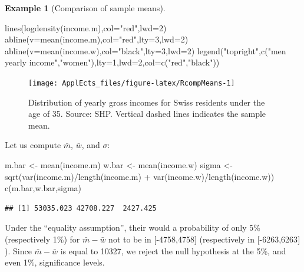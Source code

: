 \documentclass[
  12pt,
]{book}
\newenvironment{Shaded}{\begin{snugshade}}{\end{snugshade}}
\newcommand{\AttributeTok}[1]{\textcolor[rgb]{0.77,0.63,0.00}{#1}}
\newcommand{\DecValTok}[1]{\textcolor[rgb]{0.00,0.00,0.81}{#1}}
\newcommand{\FunctionTok}[1]{\textcolor[rgb]{0.00,0.00,0.00}{#1}}
\newcommand{\NormalTok}[1]{#1}
\newcommand{\OtherTok}[1]{\textcolor[rgb]{0.56,0.35,0.01}{#1}}
\newcommand{\SpecialCharTok}[1]{\textcolor[rgb]{0.00,0.00,0.00}{#1}}
\newcommand{\StringTok}[1]{\textcolor[rgb]{0.31,0.60,0.02}{#1}}
\theoremstyle{definition}
\theoremstyle{definition}
\newtheorem{example}{Example}[chapter]
\theoremstyle{definition}
\theoremstyle{definition}
\theoremstyle{remark}
\begin{document}
\begin{example}[Comparison of sample means]
\begin{Shaded}
\begin{Highlighting}[]
\FunctionTok{lines}\NormalTok{(}\FunctionTok{logdensity}\NormalTok{(income.m),}\AttributeTok{col=}\StringTok{"red"}\NormalTok{,}\AttributeTok{lwd=}\DecValTok{2}\NormalTok{)}
\FunctionTok{abline}\NormalTok{(}\AttributeTok{v=}\FunctionTok{mean}\NormalTok{(income.m),}\AttributeTok{col=}\StringTok{"red"}\NormalTok{,}\AttributeTok{lty=}\DecValTok{3}\NormalTok{,}\AttributeTok{lwd=}\DecValTok{2}\NormalTok{)}
\FunctionTok{abline}\NormalTok{(}\AttributeTok{v=}\FunctionTok{mean}\NormalTok{(income.w),}\AttributeTok{col=}\StringTok{"black"}\NormalTok{,}\AttributeTok{lty=}\DecValTok{3}\NormalTok{,}\AttributeTok{lwd=}\DecValTok{2}\NormalTok{)}
\FunctionTok{legend}\NormalTok{(}\StringTok{"topright"}\NormalTok{,}\FunctionTok{c}\NormalTok{(}\StringTok{"men yearly income"}\NormalTok{,}\StringTok{"women"}\NormalTok{),}\AttributeTok{lty=}\DecValTok{1}\NormalTok{,}\AttributeTok{lwd=}\DecValTok{2}\NormalTok{,}\AttributeTok{col=}\FunctionTok{c}\NormalTok{(}\StringTok{"red"}\NormalTok{,}\StringTok{"black"}\NormalTok{))}
\end{Highlighting}
\end{Shaded}

\begin{figure}
\texttt{[image: ApplEcts\_files/figure-latex/RcompMeans-1]} \caption{Distribution of yearly gross incomes for Swiss residents under the age of 35. Source: SHP. Vertical dashed lines indicates the sample mean.}\label{fig:RcompMeans}
\end{figure}

Let us compute \(\bar{m}\), \(\bar{w}\), and \(\sigma\):

\begin{Shaded}
\begin{Highlighting}[]
\NormalTok{m.bar }\OtherTok{\textless{}{-}} \FunctionTok{mean}\NormalTok{(income.m)}
\NormalTok{w.bar }\OtherTok{\textless{}{-}} \FunctionTok{mean}\NormalTok{(income.w)}
\NormalTok{sigma }\OtherTok{\textless{}{-}} \FunctionTok{sqrt}\NormalTok{(}\FunctionTok{var}\NormalTok{(income.m)}\SpecialCharTok{/}\FunctionTok{length}\NormalTok{(income.m) }\SpecialCharTok{+} \FunctionTok{var}\NormalTok{(income.w)}\SpecialCharTok{/}\FunctionTok{length}\NormalTok{(income.w))}
\FunctionTok{c}\NormalTok{(m.bar,w.bar,sigma)}
\end{Highlighting}
\end{Shaded}

\begin{verbatim}
## [1] 53035.023 42708.227  2427.425
\end{verbatim}

Under the ``equality assumption'', their would a probability of only 5\% (respectively 1\%) for \(\bar{m} - \bar{w}\) not to be in \([\)-4758,4758\(]\) (respectively in \([\)-6263,6263\(]\)). Since \(\bar{m} - \bar{w}\) is equal to 10327, we reject the null hypothesis at the 5\%, and even 1\%, significance levels.
\end{example}
\end{document}
